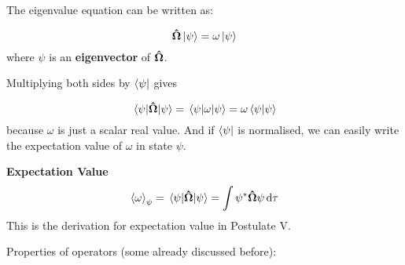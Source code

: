 \documentclass[11pt]{article}
\theoremstyle{definition}
\begin{document}
The eigenvalue equation can be written as:

\begin{equation*}
    \vectorunit{\Omega} \ket{\psi} = \omega \ket{\psi}
\end{equation*}
where $\psi$ is an \textbf{eigenvector} of $\vectorunit{\Omega}$.

Multiplying both sides by $\bra{\psi}$ gives

\begin{equation*}
    \ev{\vectorunit{\Omega}}{\psi} = \ev{\omega}{\psi} = \omega \bra{\psi}\ket{\psi}
\end{equation*}
because $\omega$ is just a scalar real value. And if $\bra{\psi}$ is normalised, we can easily write the expectation value of $\omega$ in state $\psi$.

\begin{shaded}
\textbf{Expectation Value}
\begin{equation*}
    \expval{\omega}_{\psi} =  \ev{\vectorunit{\Omega}}{\psi} = \int \psi^* \vectorunit{\Omega} \psi \dd{\tau}
\end{equation*}
This is the derivation for expectation value in Postulate V.
\end{shaded}

Properties of operators (some already discussed before):
\end{document}
